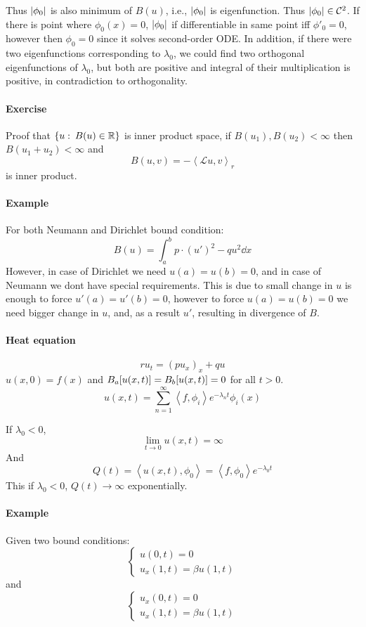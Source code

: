 Thus $\abs{\phi_0}$ is also minimum of $B(u)$, i.e.,  $\abs{\phi_0}$ is eigenfunction. Thus $\abs{\phi_0}\in \mathcal{C}^2$. If there is point where $\phi_0(x) = 0$, $\abs{\phi_0}$ if differentiable in same point iff $\phi'_0=0$, however then $\phi_0=0$ since it solves second-order ODE. In addition, if there were two eigenfunctions corresponding to $\lambda_0$, we could find two orthogonal eigenfunctions of $\lambda_0$, but both are positive and integral of their multiplication is positive, in contradiction to orthogonality.
\paragraph{Exercise}
Proof that $\qty{u: \: B(u) \in \mathbb{R}}$ is inner product space, if $B(u_1), B(u_2) < \infty $ then $B(u_1+u_2) < \infty $ and 
$$B(u,v) = -\left\langle \mathcal{L}u, v \right\rangle_r $$
is inner product.
\paragraph{Example}
For both Neumann and Dirichlet bound condition:
$$B(u) = \int_a^b  p\cdot (u')^2 - qu^2 \dd{x}$$
However, in case of Dirichlet we need $u(a)=u(b)=0$, and in case of Neumann we dont have special requirements. This is due to small change in $u$ is enough to force $u'(a)=u'(b)=0$, however to force $u(a)=u(b)=0$ we need bigger change in $u$, and, as a result $u'$, resulting in divergence of $B$.
\paragraph{Heat equation}
$$ru_t = (pu_x)_x + qu$$
$u(x,0) = f(x)$ and $B_a\qty[u(x,t)]=B_b\qty[u(x,t)]=0$ for all $t>0$.
$$u(x,t) = \sum_{n=1}^\infty \left\langle f, \phi_i \right\rangle e^{-\lambda_n t} \phi_i(x)$$

If $\lambda_0 < 0$, 
$$\lim_{t\to 0} u(x,t) = \infty$$
And
$$Q(t) = \left\langle u(x,t), \phi_0 \right\rangle = \left\langle f, \phi_0 \right\rangle e^{-\lambda_0 t}$$
This if $\lambda_0 < 0$, $Q(t) \to \infty$ exponentially.
\paragraph{Example}
Given two bound conditions:
$$\begin{cases}
u(0,t) = 0\\
u_x(1,t) = \beta u(1,t)
\end{cases}$$
and 
$$\begin{cases}
u_x(0,t) = 0\\
u_x(1,t) = \beta u(1,t)
\end{cases}$$

